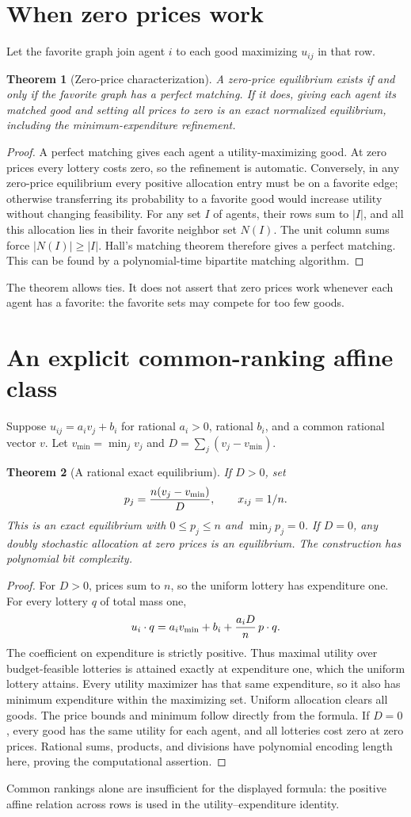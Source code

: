 \documentclass[11pt,a4paper]{article}
\newtheorem{theorem}{Theorem}[section]
\theoremstyle{definition}
\theoremstyle{remark}
\begin{document}
\section{When zero prices work}
Let the favorite graph join agent $i$ to each good maximizing $u_{ij}$ in that row.
\begin{theorem}[Zero-price characterization]
A zero-price equilibrium exists if and only if the favorite graph has a perfect matching. If it does, giving each agent its matched good and setting all prices to zero is an exact normalized equilibrium, including the minimum-expenditure refinement.
\end{theorem}
\begin{proof}
A perfect matching gives each agent a utility-maximizing good. At zero prices every lottery costs zero, so the refinement is automatic. Conversely, in any zero-price equilibrium every positive allocation entry must be on a favorite edge; otherwise transferring its probability to a favorite good would increase utility without changing feasibility. For any set $I$ of agents, their rows sum to $|I|$, and all this allocation lies in their favorite neighbor set $N(I)$. The unit column sums force $|N(I)|\ge|I|$. Hall's matching theorem therefore gives a perfect matching. This can be found by a polynomial-time bipartite matching algorithm.
\end{proof}
The theorem allows ties. It does not assert that zero prices work whenever each agent has a favorite: the favorite sets may compete for too few goods.
\section{An explicit common-ranking affine class}
Suppose
$u_{ij}=a_i v_j+b_i$ for rational $a_i>0$, rational $b_i$, and a common rational vector $v$. Let $v_{\min}=\min_jv_j$ and $D=\sum_j(v_j-v_{\min})$.
\begin{theorem}[A rational exact equilibrium]
If $D>0$, set
\[
 p_j={n(v_j-v_{\min})\over D},\qquad x_{ij}=1/n.
\]
This is an exact equilibrium with $0\le p_j\le n$ and $\min_jp_j=0$. If $D=0$, any doubly stochastic allocation at zero prices is an equilibrium. The construction has polynomial bit complexity.
\end{theorem}
\begin{proof}
For $D>0$, prices sum to $n$, so the uniform lottery has expenditure one. For every lottery $q$ of total mass one,
\[
 u_i\cdot q=a_i v_{\min}+b_i+{a_iD\over n}\,p\cdot q.
\]
The coefficient on expenditure is strictly positive. Thus maximal utility over budget-feasible lotteries is attained exactly at expenditure one, which the uniform lottery attains. Every utility maximizer has that same expenditure, so it also has minimum expenditure within the maximizing set. Uniform allocation clears all goods. The price bounds and minimum follow directly from the formula. If $D=0$, every good has the same utility for each agent, and all lotteries cost zero at zero prices. Rational sums, products, and divisions have polynomial encoding length here, proving the computational assertion.
\end{proof}
Common rankings alone are insufficient for the displayed formula: the positive affine relation across rows is used in the utility--expenditure identity.
\end{document}

